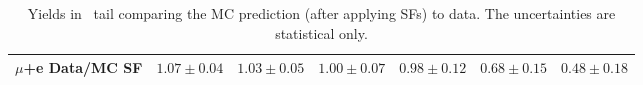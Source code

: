 \begin{table}[!h]
\begin{center}
{\begin{tabular}{l||c||c|c|c|c|c}
\hline
$\mu$+e Data/MC SF 		  & $1.07 \pm 0.04$ & $1.03 \pm 0.05$ & $1.00 \pm 0.07$ & $0.98 \pm 0.12$ & $0.68 \pm 0.15$ & $0.48 \pm 0.18$ \\
\hline
\end{tabular}}
\caption{ Yields in \mt\ tail comparing the MC prediction (after
  applying SFs) to data. The uncertainties are statistical only.
\label{tab:hugecr5yields}}
\end{center}
\end{table}
